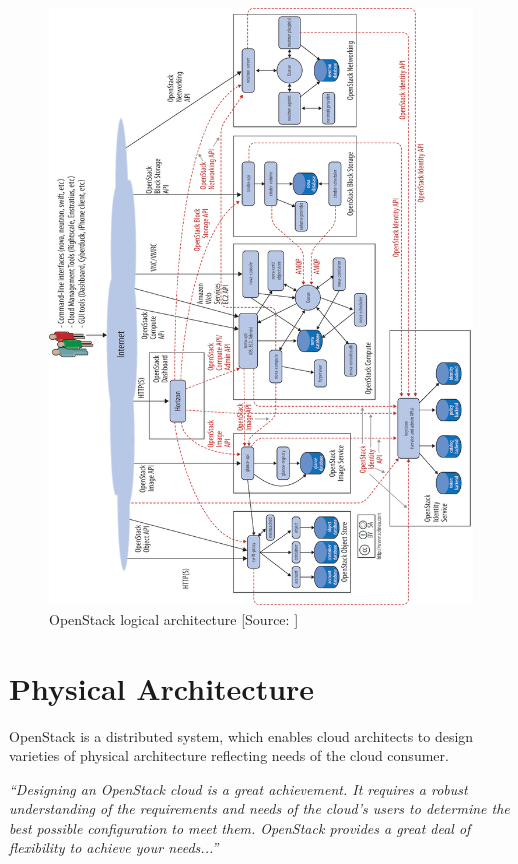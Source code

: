 \begin{figure}[!h]
  \centerline{\includegraphics[width=14cm]{fig/OpenStack_logical_architecture_2.png}}
  \caption{OpenStack logical architecture [Source: \cite{OperationsGuide}]}
  \label{fig:OpenStack_logical_arch}
\end{figure}

\section{Physical Architecture}
OpenStack is a distributed system, which enables cloud architects to design varieties of physical architecture reflecting needs of the cloud consumer.

\textit{“Designing an OpenStack cloud is a great achievement. It requires a robust understanding of the requirements and needs of the cloud’s users to determine the best possible configuration to meet them. OpenStack provides a great deal of flexibility to achieve your needs...”} \cite{OperationsGuide}




